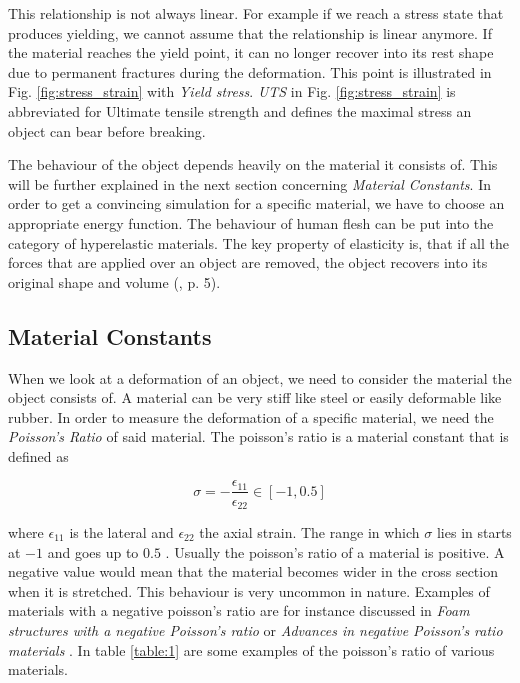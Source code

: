This relationship is not always linear. For example if we reach a stress state that produces yielding, we cannot assume that the relationship is linear anymore. If the material reaches the yield point, it can no longer recover into its rest shape due to permanent fractures during the deformation. This point is illustrated in Fig. \ref{fig:stress_strain} with \textit{Yield stress}. \textit{UTS} in Fig. \ref{fig:stress_strain} is abbreviated for Ultimate tensile strength and defines the maximal stress an object can bear before breaking. 

The behaviour of the object depends heavily on the material it consists of. This will be further explained in the next section concerning \textit{Material Constants}. In order to get a convincing simulation for a specific material, we have to choose an appropriate energy function. The behaviour of human flesh can be put into the category of hyperelastic materials. The key property of elasticity is, that if all the forces that are applied over an object are removed, the object recovers into its original shape and volume (\cite{KORSUNSKY20175}, p. 5).


\subsection{Material Constants}
When we look at a deformation of an object, we need to consider the material the object consists of. A material can be very stiff like steel or easily deformable like rubber. In order to measure the deformation of a specific material, we need the \textit{Poisson's Ratio} of said material. The poisson's ratio is a material constant that is defined as 

\begin{equation}\label{eq:poisson}
\sigma = - \frac{\epsilon_{11}}{\epsilon_{22}} \in [-1, 0.5]
\end{equation}

where $\epsilon_{11}$ is the lateral and $\epsilon_{22}$ the axial strain. The range in which $\sigma$ lies in starts at $-1$ and goes up to $0.5$ \cite{PhysRevB.80.132104}. Usually the poisson's ratio of a material is positive. A negative value would mean that the material becomes wider in the cross section when it is stretched. This behaviour is very uncommon in nature. Examples of materials with a negative poisson's ratio are for instance discussed in \textit{Foam structures with a negative Poisson's ratio} \cite{lakes1987foam} or \textit{Advances in negative Poisson's ratio materials} \cite{lakes1993advances}. In table \ref{table:1} are some examples of the poisson's ratio of various materials.


